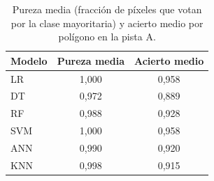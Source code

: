 \begin{table}[htbp]
 \centering
 \small
 \caption{Pureza media (fracción de píxeles que votan por la clase mayoritaria) y acierto medio por polígono en la pista A.}
 \label{tab:pureza}
 \begin{tabular}{lcc}
  \toprule
  Modelo & Pureza media & Acierto medio \\
  \midrule
  LR & 1{,}000 & 0{,}958 \\
  DT & 0{,}972 & 0{,}889 \\
  RF & 0{,}988 & 0{,}928 \\
  SVM & 1{,}000 & 0{,}958 \\
  ANN & 0{,}990 & 0{,}920 \\
  KNN & 0{,}998 & 0{,}915 \\
  \bottomrule
 \end{tabular}
\end{table}
